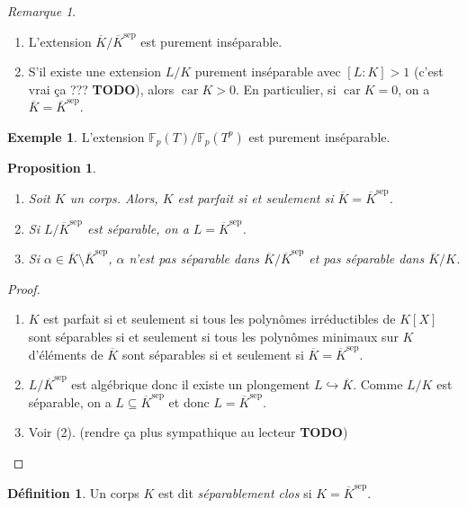 \documentclass{article}
\newcommand{\sep}{\mathrm{sep}}
\newcommand{\F}{\mathbb{F}}
\DeclareMathOperator{\car}{car}
\newcommand{\todo}{\textbf{TODO}}
\theoremstyle{plain}
\newtheorem{proposition}[theorem]{Proposition}
\theoremstyle{definition}
\newtheorem{definition}[theorem]{Définition}
\newtheorem{example}[theorem]{Exemple}
\theoremstyle{remark}
\newtheorem*{remark}{Remarque}
\begin{document}
\begin{remark} \leavevmode
   \begin{enumerate}
    \item L'extension $\overline{K}/\overline{K}^\sep$ est purement inséparable.
    \item S'il existe une extension $L/K$ purement inséparable avec $[L : K] > 1$ (c'est vrai ça ??? \todo), alors $\car K > 0$. En particulier, si $\car K = 0$, on a $\overline{K} = \overline{K}^\sep$.
   \end{enumerate} 
\end{remark}

\begin{example}
    L'extension $\F_p(T)/\F_p(T^p)$ est purement inséparable.
\end{example}

\begin{proposition} \leavevmode
    \begin{enumerate}
        \item Soit $K$ un corps. Alors, $K$ est parfait si et seulement si $\overline{K} = \overline{K}^\sep$.
        \item Si $L/\overline{K}^\sep$ est séparable, on a $L=\overline{K}^\sep$.
        \item Si $\alpha \in \overline{K} \setminus \overline{K}^\sep$, $\alpha$ n'est pas séparable dans $\overline{K}/\overline{K}^\sep$ et pas séparable dans $\overline{K}/K$.
    \end{enumerate}
\end{proposition}

\begin{proof} \leavevmode
    \begin{enumerate}
        \item $K$ est parfait si et seulement si tous les polynômes irréductibles de $K[X]$ sont séparables si et seulement si tous les polynômes minimaux sur $K$ d'éléments de $\overline{K}$ sont séparables si et seulement si $\overline{K} = \overline{K}^\sep$.
        \item $L/\overline{K}^\sep$ est algébrique donc il existe un plongement $L\hookrightarrow \overline{K}$. Comme $L/K$ est séparable, on a $L \subseteq \overline{K}^\sep$ et donc $L = \overline{K}^\sep$.
        \item Voir (2). (rendre ça plus sympathique au lecteur \todo)
    \end{enumerate}
\end{proof}

\begin{definition}
    Un corps $K$ est dit \emph{séparablement clos} si $K = \overline{K}^\sep$.
\end{definition}
\end{document}
